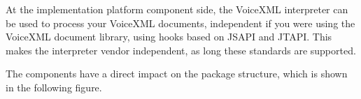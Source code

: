 \documentclass[11pt,a4paper]{article}
\begin{document}
At the implementation platform component side, the VoiceXML interpreter can be
used to process your VoiceXML documents, independent if you were using the 
VoiceXML document library, using hooks based on JSAPI and JTAPI.
This makes the interpreter vendor independent, as long these standards
are supported.

The components have a direct impact on the package structure, which is shown
in the following figure.

\begin{center}
\end{center}
\end{document}
